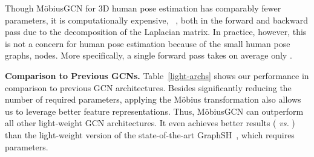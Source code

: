 \documentclass[runningheads]{llncs}
\begin{document}
Though M\"obiusGCN for 3D human pose estimation has comparably fewer parameters, it is computationally expensive, \ie~, both in the forward and backward pass due to the decomposition of the Laplacian matrix. In practice, however, this is not a concern for human pose estimation because of the small human pose graphs, \ie nodes. 
More specifically, a single forward pass takes on average only .\begin{center}
\label{light-archs}
 \end{center}
\textbf{Comparison to Previous GCNs.}
Table~\ref{light-archs} shows our performance in comparison to previous GCN architectures.
Besides significantly reducing the number of required parameters, applying the M\"obius transformation also allows us to leverage better feature representations.
Thus, M\"obiusGCN can outperform all other light-weight GCN architectures.
It even achieves better results ( \emph{vs.} ) than the light-weight version of the state-of-the-art GraphSH~\cite{xu2021graph}, which requires  parameters. 
\end{document}
